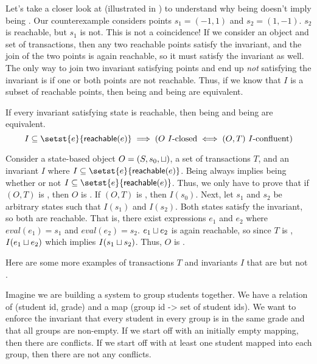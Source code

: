 

Let's take a closer look at  (illustrated in
) to understand why being \Iconfluent{} doesn't
imply being \Iclosed{}. Our counterexample considers points $s_1 = (-1, 1)$ and
$s_2 = (1, -1)$. $s_2$ is reachable, but $s_1$ is not. This is not a
coincidence! If we consider an \Iconfluent{} object and set of transactions,
then any two reachable points satisfy the invariant, and the join of the two
points is again reachable, so it must satisfy the invariant as well. The only
way to join two invariant satisfying points and end up \emph{not} satisfying
the invariant is if one or both points are not reachable. Thus, if we know that
$I$ is a subset of reachable points, then being \Iconfluent{} and being
\Iclosed{} are equivalent.

\begin{claim}
  If every invariant satisfying state is reachable, then being \Iconfluent{}
  and being \Iclosed{} are equivalent.
  \[
    I \subseteq \setst{e}{\reachable{e}} \implies
    (\text{$O$ \Iclosed{}} \iff \text{$(O, T)$ \Iconfluent})
  \]
\end{claim}
\begin{elidableproof}
  Consider a state-based object $O = (S, s_0, \sqcup)$, a set of transactions
  $T$, and an invariant $I$ where $I \subseteq \setst{e}{\reachable{e}}$.
  Being \Iclosed{} always implies being \Iconfluent{} whether or not $I
  \subseteq \setst{e}{\reachable{e}}$. Thus, we only have to prove that if $(O,
  T)$ is \Iconfluent{}, then $O$ is \Iclosed. If $(O, T)$ is \Iconfluent{},
  then $I(s_0)$. Next, let $s_1$ and $s_2$ be arbitrary states such that
  $I(s_1)$ and $I(s_2)$. Both states satisfy the invariant, so both are
  reachable. That is, there exist expressions $e_1$ and $e_2$ where $eval(e_1)
  = s_1$  and $eval(e_2) = s_2$. $e_1 \sqcup e_2$ is again reachable, so since
  $T$ is \Iconfluent{}, $I(e_1 \sqcup e_2)$ which implies $I(s_1 \sqcup s_2)$.
  Thus, $O$ is \Iclosed.
\end{elidableproof}

Here are some more examples of transactions $T$ and invariants $I$ that are
\Iconfluent{} but not \Iclosed{}.


\begin{example}
  Imagine we are building a system to group students together. We have a relation
  of (student id, grade) and a map (group id -> set of student ids). We want to
  enforce the invariant that every student in every group is in the same grade
  and that all groups are non-empty. If we start off with an initially empty
  mapping, then there are conflicts. If we start off with at least one student
  mapped into each group, then there are not any conflicts.
\end{example}

